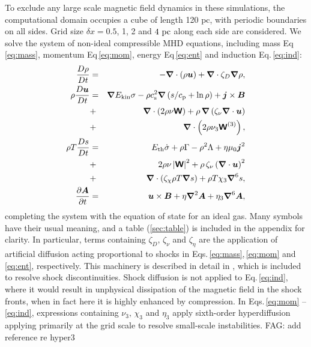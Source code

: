 \documentclass[preprint2]{aastex63}
\newcommand\ESK{E_{\rm kin}}
\newcommand\EST{E_{\rm th}}
\newcommand{\vect}[1]{{{\mbox{\boldmath $#1$}}}}%
\newcommand{\mathbfss}[1]{\textbf{\textsf{#1}}}
\newcommand\pc{~ {\rm pc}}
\newcommand{\fag}[1]{\textcolor{midgreen}{FAG: #1}}
\begin{document}
To exclude any large scale magnetic field dynamics in these simulations, the
computational domain occupies a cube of length 120 pc, with periodic boundaries
on all sides.
Grid size $\delta x=0.5$, 1, 2 and $4\pc$  along each side are considered.
We solve the system of non-ideal compressible MHD equations, including 
mass Eq\,\eqref{eq:mass}, momentum Eq\,\eqref{eq:mom}, energy Eq\,\eqref{eq:ent} and
induction Eq.\,\eqref{eq:ind}:
  \begin{eqnarray}
  \label{eq:mass}
    \frac{D\rho}{Dt} &=& 
    -\vect\nabla \cdot (\rho \vect{u})
    +\vect\nabla \cdot\zeta_D\vect\nabla\rho,\\
  \label{eq:mom}
    \rho\frac{D\vect{u}}{Dt} &=& 
    \vect\nabla{\ESK\sigma}
    -\rho c_{\rm s}^2\vect\nabla\left({s}/{c_{\rm p}}+\ln\rho\right)
    +\vect{j}\times\vect{B}
    \nonumber\\
    &+&\vect\nabla\cdot \left(2\rho\nu{\mathbfss W}\right)
    +\rho\,\vect\nabla\left(\zeta_{\nu}\vect\nabla \cdot \vect{u} \right)
    \nonumber\\
    &+&\vect\nabla\cdot \left(2\rho\nu_3{\mathbfss W}^{(3)}\right),\\
  \label{eq:ent}
    \rho T\frac{D s}{Dt} &=&
     \EST\dot\sigma +\rho\Gamma
    -\rho^2\Lambda +\eta\mu_0\vect{j}^2 
    \nonumber\\
    &+&2 \rho \nu\left|{\mathbfss W}\right|^{2}
    +\rho\,\zeta_{\nu}\left(\vect\nabla \cdot \vect{u} \right)^2
    \nonumber\\
    &+&\vect\nabla\cdot\left(\zeta_\chi\rho T\vect\nabla s\right)
    +\rho T\chi_3\vect\nabla^6 s,\\
  \label{eq:ind}
    \frac{\partial \vect{A}}{\partial t} &=&
    \vect{u}\times\vect{B}
    +\eta\vect\nabla^2\vect{A}
    +\eta_3\vect\nabla^6\vect{A},
  \end{eqnarray}
completing the system with the equation of state for an ideal gas.
Many symbols have their usual meaning, and a table (\ref{sec:table}) is included in the appendix
for clarity.
In particular, terms containing $\zeta_D,\,\zeta_\nu$ and $\zeta_\eta$ are the
application of artificial diffusion acting proportional to shocks in 
Eqs.\,\eqref{eq:mass},\,\eqref{eq:mom} and \eqref{eq:ent}, respectively.
This machinery is described in detail in \citet{GMKSH20}, which is included to
resolve shock discontinuities.
Shock diffusion is not applied to Eq.\,\eqref{eq:ind}, where it would result in 
unphysical dissipation of the magnetic field in the shock fronts, when in fact 
here it is highly enhanced by compression.
In Eqs.\,\eqref{eq:mom} -- \eqref{eq:ind}, expressions containing 
$\nu_3,\,\chi_3$ and $\eta_3$ apply sixth-order hyperdiffusion applying primarily
at the grid scale to resolve small-scale instabilities.
\fag{add reference re hyper3}
\end{document}
